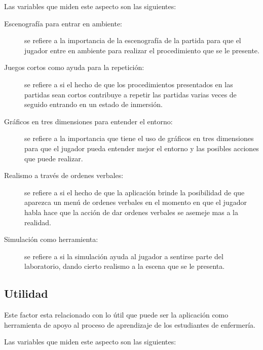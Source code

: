 Las variables que miden este aspecto son las siguientes:

\begin{description}

\item[Escenografía para entrar en ambiente:] se refiere a la importancia de la
    escenografía de la partida para que el jugador entre en ambiente para
    realizar el procedimiento que se le presente.

\item[Juegos cortos como ayuda para la repetición:] se refiere a si el hecho de
    que los procedimientos presentados en las partidas sean cortos contribuye a
    repetir las partidas varias veces de seguido entrando en un estado de
    inmersión.

\item[Gráficos en tres dimensiones para entender el entorno:] se refiere a la
    importancia que tiene el uso de gráficos en tres dimensiones para que el
    jugador pueda entender mejor el entorno y las posibles acciones que puede
    realizar.

\item[Realismo a través de ordenes verbales:] se refiere a si el hecho de que la
    aplicación brinde la posibilidad de que aparezca un menú de ordenes verbales
    en el momento en que el jugador habla hace que la acción de dar ordenes
    verbales se asemeje mas a la realidad.

\item[Simulación como herramienta:] se refiere a si la simulación ayuda al
    jugador a sentirse parte del laboratorio, dando cierto realismo a la escena
    que se le presenta.

\end{description}

\subsection{Utilidad}

Este factor esta relacionado con lo útil que puede ser la aplicación como
herramienta de apoyo al proceso de aprendizaje de los estudiantes de enfermería.

Las variables que miden este aspecto son las siguientes:

